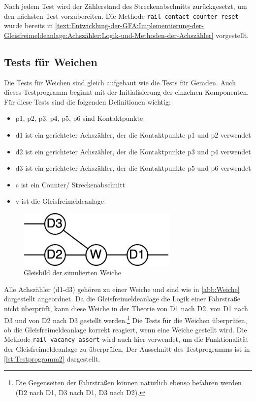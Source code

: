 Nach jedem Test wird der Zählerstand des Streckenabschnitts zurückgesetzt, um den nächsten Test vorzubereiten. Die Methode \texttt{rail\_contact\_counter\_reset} wurde bereits in \autoref{text:Entwicklung-der-GFA:Implementierung-der-Gleisfreimeldeanlage:Achszähler:Logik-und-Methoden-der-Achszähler}  vorgestellt.

\subsection{Tests für Weichen}\label{text:Entwicklung-der-GFA:Softwaretests:Tests-für-Weichen}

Die Tests für Weichen sind gleich aufgebaut wie die Tests für Geraden. Auch dieses Testprogramm beginnt mit der Initialisierung der einzelnen Komponenten. Für diese Tests sind die folgenden Definitionen wichtig:
\begin{itemize}
    \item p1, p2, p3, p4, p5, p6 sind Kontaktpunkte
    \item d1 ist ein gerichteter Achszähler, der die Kontaktpunkte p1 und p2 verwendet
    \item d2 ist ein gerichteter Achszähler, der die Kontaktpunkte p3 und p4 verwendet
    \item d3 ist ein gerichteter Achszähler, der die Kontaktpunkte p5 und p6 verwendet
    \item c ist ein Counter/ Streckenabschnitt
    \item v ist die Gleisfreimeldeanlage
\end{itemize}

\begin{figure}[H]
    \centering
    \includegraphics[width=0.7\textwidth]{Assets/Images/4-Entwicklung-der-GFA/Weiche.png}
    \caption{Gleisbild der simulierten Weiche}\label{abb:Weiche}
\end{figure}

Alle Achszähler (d1-d3) gehören zu einer Weiche und sind wie in \autoref{abb:Weiche} dargestellt angeordnet. Da die Gleisfreimeldeanlage die Logik einer Fahrstraße nicht überprüft, kann diese Weiche in der Theorie von D1 nach D2, von D1 nach D3 und von D2 nach D3 gestellt werden.\footnote{Die Gegenseiten der Fahrstraßen können natürlich ebenso befahren werden (D2 nach D1, D3 nach D1, D3 nach D2).} Die Tests für die Weichen überprüfen, ob die Gleisfreimeldeanlage korrekt reagiert, wenn eine Weiche gestellt wird. Die Methode \texttt{rail\_vacancy\_assert} wird auch hier verwendet, um die Funktionalität der Gleisfreimeldeanlage zu überprüfen. Der Ausschnitt des Testprogramms ist in \autoref{lst:Testprogramm2} dargestellt.

